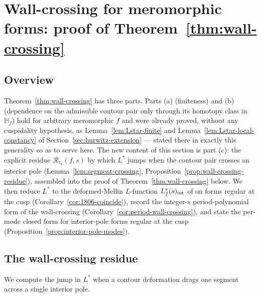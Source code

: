 \documentclass[11pt]{article}
\numberwithin{equation}{section}  %
\newcommand{\HH}{\mathbb{H}}
\begin{document}
\section{Wall-crossing for meromorphic forms: proof of Theorem~\ref{thm:wall-crossing}}\label{sec:wall-crossing}

\subsection{Overview}\label{subsec:wall-crossing-overview}

Theorem~\ref{thm:wall-crossing} has three parts.  Parts (a)
(finiteness) and (b) (dependence on the admissible contour pair only
through its homotopy class in $\HH_f$) hold for arbitrary meromorphic
$f$ and were already proved, without any cuspidality hypothesis, as
Lemma~\ref{lem:Lstar-finite} and Lemma~\ref{lem:Lstar-local-constancy}
of Section~\ref{sec:hurwitz-extension} --- stated there in exactly this
generality so as to serve here.  The new content of this section is
part (c): the explicit residue $\mathcal{R}_{\tau_p}(f, s)$ by which
$L^*$ jumps when the contour pair crosses an interior pole
(Lemma~\ref{lem:segment-crossing},
Proposition~\ref{prop:wall-crossing-residue}), assembled into the proof
of Theorem~\ref{thm:wall-crossing} below.  We then reduce $L^*$ to the
deformed-Mellin $L$-function $L_f^*(s)_{\rm int}$ of \cite{1806} on
forms regular at the cusp (Corollary~\ref{cor:1806-coincide}), record
the integer-$s$ period-polynomial form of the wall-crossing
(Corollary~\ref{cor:period-wall-crossing}), and state the per-mode
closed form for interior-pole forms regular at the cusp
(Proposition~\ref{prop:interior-pole-modes}).

\subsection{The wall-crossing residue}\label{subsec:wall-crossing}

We compute the jump in $L^*$ when a contour deformation drags one
segment across a single interior pole.
\end{document}
